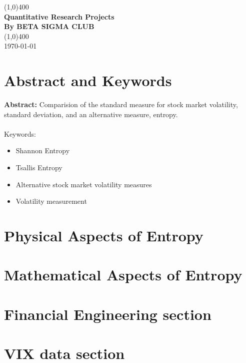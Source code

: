 \documentclass[11pt]{article}
\begin{document}
\begin{titlepage}
\begin{center}
\vspace*{1cm}
\vfill
\line(1,0){400}\\[1mm]
\huge{\textbf{Quantitative Research Projects}}\\[3mm]
\Large{\textbf{By BETA SIGMA CLUB}}\\[1mm]
\line(1,0){400}\\[3mm]
\vfill
\today

\end{center}
\end{titlepage}

\section{Abstract and Keywords}
\textbf{Abstract:} Comparision of the standard measure for stock market volatility, standard deviation, and an alternative measure, entropy.\\
\\
Keywords:
\begin{itemize}
\item Shannon Entropy
\item Tsallis Entropy
\item Alternative stock market volatility measures
\item Volatility measurement

\end{itemize}

\section{Physical Aspects of Entropy}
\section{Mathematical Aspects of Entropy}
\section{Financial Engineering section}
\section{VIX data section}
\end{document}
